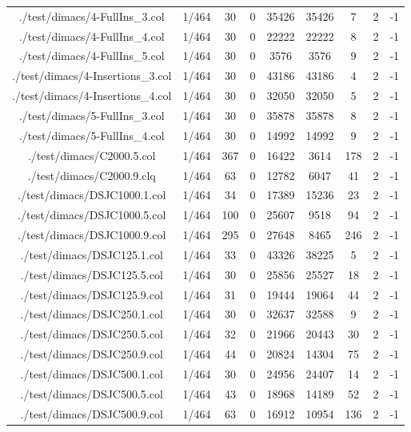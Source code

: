 \begin{table}[htb]
\begin{tabular}{@{}ccccccccc@{}}
        ./test/dimacs/4-FullIns\_3.col & 1/464 & 30 & 0 & 35426 & 35426 & 7 & 2 & -1 \\
        ./test/dimacs/4-FullIns\_4.col & 1/464 & 30 & 0 & 22222 & 22222 & 8 & 2 & -1 \\
        ./test/dimacs/4-FullIns\_5.col & 1/464 & 30 & 0 & 3576 & 3576 & 9 & 2 & -1 \\
        ./test/dimacs/4-Insertions\_3.col & 1/464 & 30 & 0 & 43186 & 43186 & 4 & 2 & -1 \\
        ./test/dimacs/4-Insertions\_4.col & 1/464 & 30 & 0 & 32050 & 32050 & 5 & 2 & -1 \\
        ./test/dimacs/5-FullIns\_3.col & 1/464 & 30 & 0 & 35878 & 35878 & 8 & 2 & -1 \\
        ./test/dimacs/5-FullIns\_4.col & 1/464 & 30 & 0 & 14992 & 14992 & 9 & 2 & -1 \\
        ./test/dimacs/C2000.5.col & 1/464 & 367 & 0 & 16422 & 3614 & 178 & 2 & -1 \\
        ./test/dimacs/C2000.9.clq & 1/464 & 63 & 0 & 12782 & 6047 & 41 & 2 & -1 \\
        ./test/dimacs/DSJC1000.1.col & 1/464 & 34 & 0 & 17389 & 15236 & 23 & 2 & -1 \\
        ./test/dimacs/DSJC1000.5.col & 1/464 & 100 & 0 & 25607 & 9518 & 94 & 2 & -1 \\
        ./test/dimacs/DSJC1000.9.col & 1/464 & 295 & 0 & 27648 & 8465 & 246 & 2 & -1 \\
        ./test/dimacs/DSJC125.1.col & 1/464 & 33 & 0 & 43326 & 38225 & 5 & 2 & -1 \\
        ./test/dimacs/DSJC125.5.col & 1/464 & 30 & 0 & 25856 & 25527 & 18 & 2 & -1 \\
        ./test/dimacs/DSJC125.9.col & 1/464 & 31 & 0 & 19444 & 19064 & 44 & 2 & -1 \\
        ./test/dimacs/DSJC250.1.col & 1/464 & 30 & 0 & 32637 & 32588 & 9 & 2 & -1 \\
        ./test/dimacs/DSJC250.5.col & 1/464 & 32 & 0 & 21966 & 20443 & 30 & 2 & -1 \\
        ./test/dimacs/DSJC250.9.col & 1/464 & 44 & 0 & 20824 & 14304 & 75 & 2 & -1 \\
        ./test/dimacs/DSJC500.1.col & 1/464 & 30 & 0 & 24956 & 24407 & 14 & 2 & -1 \\
        ./test/dimacs/DSJC500.5.col & 1/464 & 43 & 0 & 18968 & 14189 & 52 & 2 & -1 \\
        ./test/dimacs/DSJC500.9.col & 1/464 & 63 & 0 & 16912 & 10954 & 136 & 2 & -1 \\

\end{tabular}
\end{table}
